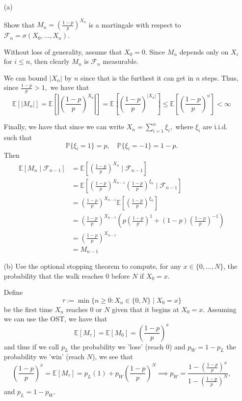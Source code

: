 \documentclass[11pt]{article}
\newcommand{\bbE}{\mathbb{E}}
\newcommand{\bbP}{\mathbb{P}}
\begin{document}
\begin{itemize}
    \item[(a)] 
    
    Show that \(M_n = \left(\frac{1 - p}{p}\right)^{X_n}\) is a martingale with respect to \(\mathcal{F}_n = \sigma(X_0, \ldots, X_n)\).
\begin{solution} Without loss of generality, assume that $X_0 = 0.$
    Since $M_n$ depends only on $X_i$ for $i \leq n$, then clearly $M_n$ is $\mathcal{F}_n$ measurable.

    We can bound $|X_n|$ by $n$ since that is the furthest it can get in $n$ steps. Thus, since $\frac{1-p}{p} >1,$ we have that 
    \[\bbE[|M_n|]  = \bbE\left[\left|\left(\frac{1 - p}{p}\right)^{X_n}\right|\right] = \bbE\left[\left(\frac{1 - p}{p}\right)^{|X_n|}\right] \leq \bbE\left[\left(\frac{1 - p}{p}\right)^{n}\right] < \infty\]

    Finally, we have that since we can write $X_n = \sum_{i=1}^n \xi_i,$ where $\xi_i$ are i.i.d. such that
    \[\bbP\{\xi_i = 1\} = p, \quad \bbP\{\xi_i = -1\} = 1-p.\] Then
    \begin{align*}
        \bbE[M_n \mid \mathcal{F}_{n-1}] &= \bbE\left[\left(\frac{1-p}{p}\right)^{X_n} \mid \mathcal{F}_{n-1}\right]\\
        &= \bbE\left[\left(\frac{1-p}{p}\right)^{X_{n-1}}\left(\frac{1-p}{p}\right)^{\xi_{n}} \mid \mathcal{F}_{n-1}\right]\\
        &= \left(\frac{1-p}{p}\right)^{X_{n-1}}\bbE\left[\left(\frac{1-p}{p}\right)^{\xi_{n}}\right]\\
        &=\left(\frac{1-p}{p}\right)^{X_{n-1}} (p\left(\frac{1-p}{p}\right)^{1} + (1-p)\left(\frac{1-p}{p}\right)^{-1}) \\
        &= \left(\frac{1-p}{p}\right)^{X_{n-1}}\\
        &= M_{n-1}
    \end{align*}
\end{solution}
    \item[(b)] Use the optional stopping theorem to compute, for any \(x \in \{0, \ldots, N\}\), the probability that the walk reaches 0 before \(N\) if \(X_0 = x\).
    \begin{solution}
        Define
        \[\tau:= \min\{ n \geq 0 : X_n \in \{0, N\} \mid X_0 = x\}\] be the first time $X_n$ reaches $0$ or $N$ given that it begins at $X_0 = x.$ Assuming we can use the OST, we have that 
        \[\bbE[M_\tau] = \bbE[M_0] = \left(\frac{1-p}{p}\right)^x\] and thus if we call $p_L$ the probability we 'lose' (reach $0$) and $p_W = 1-p_L$ the probability we 'win' (reach $N$), we see that
        \[\left(\frac{1-p}{p}\right)^x = \bbE[M_\tau] = p_L (1) + p_W\left(\frac{1-p}{p}\right)^N \implies p_W = \frac{1 - \left(\frac{1-p}{p}\right)^x}{1 - \left(\frac{1-p}{p}\right)^N},\] and $p_L = 1-p_W.$ 


\end{solution}
\end{itemize}
\end{document}
